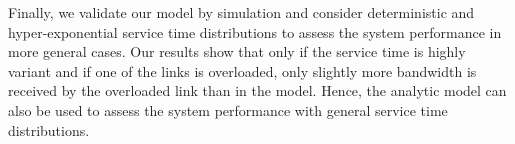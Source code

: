 Finally, we validate our model by simulation and consider deterministic and hyper-exponential service time distributions to assess the system performance in more general cases.
Our results show that only if the service time is highly variant and if one of the links is overloaded, only slightly more bandwidth is received by the overloaded link than in the model. Hence, the analytic model can also be used to assess the system performance with general service time distributions.
